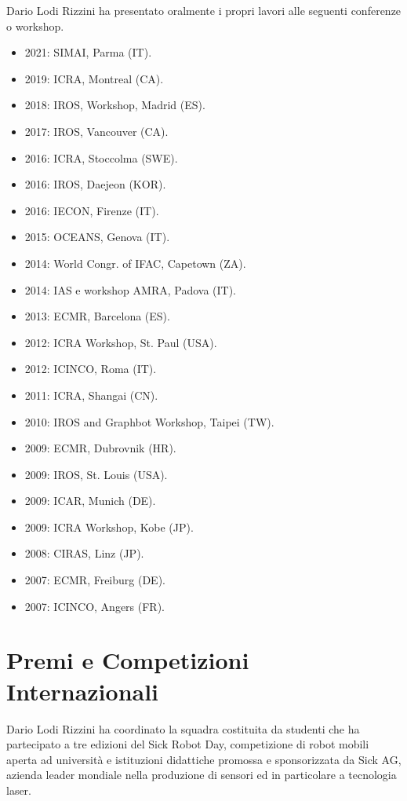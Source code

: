 \documentclass[11pt]{article}
\begin{document}
Dario Lodi Rizzini ha presentato oralmente i propri lavori alle seguenti conferenze o workshop.
\begin{itemize}
\item 2021: SIMAI, Parma (IT). 
\item 2019: ICRA, Montreal (CA).
\item 2018: IROS, Workshop, Madrid (ES).
\item 2017: IROS, Vancouver (CA).
\item 2016: ICRA, Stoccolma (SWE).
\item 2016: IROS, Daejeon (KOR).
\item 2016: IECON, Firenze (IT).
\item 2015: OCEANS, Genova (IT).
\item 2014: World Congr. of IFAC, Capetown (ZA).
\item 2014: IAS e workshop AMRA, Padova (IT).
\item 2013: ECMR, Barcelona (ES). 
\item 2012: ICRA Workshop, St. Paul (USA). 
\item 2012: ICINCO, Roma (IT). 
\item 2011: ICRA, Shangai (CN). 
\item 2010: IROS and Graphbot Workshop, Taipei (TW).
\item 2009: ECMR, Dubrovnik (HR).
\item 2009: IROS, St. Louis (USA).
\item 2009: ICAR, Munich (DE).
\item 2009: ICRA Workshop, Kobe (JP).
\item 2008: CIRAS, Linz (JP).
\item 2007: ECMR, Freiburg (DE).
\item 2007: ICINCO, Angers (FR).
\end{itemize}


\section*{Premi e Competizioni Internazionali}

Dario Lodi Rizzini ha coordinato la squadra costituita da studenti che ha partecipato a tre edizioni del Sick Robot Day,
competizione di robot mobili aperta ad universit\`a e istituzioni didattiche promossa e sponsorizzata 
da Sick AG, azienda leader mondiale nella produzione di sensori ed in particolare a tecnologia laser. 
\end{document}
